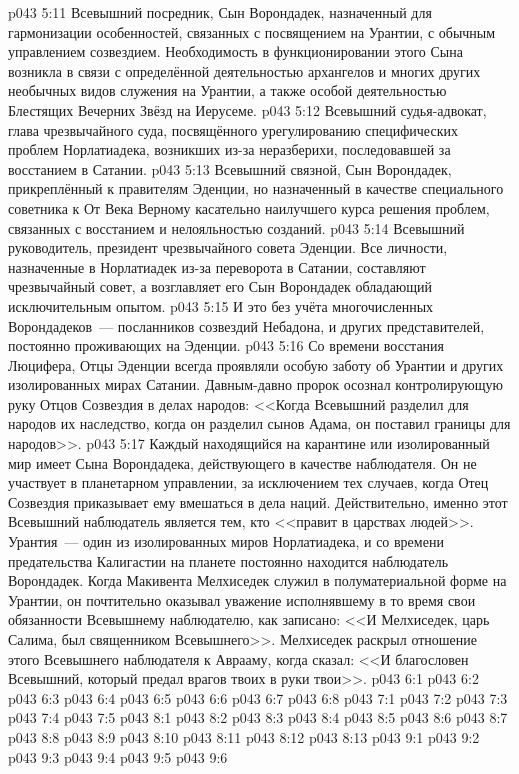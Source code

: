 \vs p043 5:11 Всевышний посредник, Сын Ворондадек, назначенный для гармонизации особенностей, связанных с посвящением на Урантии, с обычным управлением созвездием. Необходимость в функционировании этого Сына возникла в связи с определённой деятельностью архангелов и многих других необычных видов служения на Урантии, а также особой деятельностью Блестящих Вечерних Звёзд на Иерусеме.
\vs p043 5:12 Всевышний судья\hyp{}адвокат, глава чрезвычайного суда, посвящённого урегулированию специфических проблем Норлатиадека, возникших из-за неразберихи, последовавшей за восстанием в Сатании.
\vs p043 5:13 Всевышний связной, Сын Ворондадек, прикреплённый к правителям Эденции, но назначенный в качестве специального советника к От Века Верному касательно наилучшего курса решения проблем, связанных с восстанием и нелояльностью созданий.
\vs p043 5:14 Всевышний руководитель, президент чрезвычайного совета Эденции. Все личности, назначенные в Норлатиадек из-за переворота в Сатании, составляют чрезвычайный совет, а возглавляет его Сын Ворондадек обладающий исключительным опытом.
\vs p043 5:15 И это без учёта многочисленных Ворондадеков~--- посланников созвездий Небадона, и других представителей, постоянно проживающих на Эденции.
\vs p043 5:16 \pc Со времени восстания Люцифера, Отцы Эденции всегда проявляли особую заботу об Урантии и других изолированных мирах Сатании. Давным\hyp{}давно пророк осознал контролирующую руку Отцов Созвездия в делах народов: <<Когда Всевышний разделил для народов их наследство, когда он разделил сынов Адама, он поставил границы для народов>>.
\vs p043 5:17 Каждый находящийся на карантине или изолированный мир имеет Сына Ворондадека, действующего в качестве наблюдателя. Он не участвует в планетарном управлении, за исключением тех случаев, когда Отец Созвездия приказывает ему вмешаться в дела наций. Действительно, именно этот Всевышний наблюдатель является тем, кто <<правит в царствах людей>>. Урантия~--- один из изолированных миров Норлатиадека, и со времени предательства Калигастии на планете постоянно находится наблюдатель Ворондадек. Когда Макивента Мелхиседек служил в полуматериальной форме на Урантии, он почтительно оказывал уважение исполнявшему в то время свои обязанности Всевышнему наблюдателю, как записано: <<И Мелхиседек, царь Салима, был священником Всевышнего>>. Мелхиседек раскрыл отношение этого Всевышнего наблюдателя к Аврааму, когда сказал: <<И благословен Всевышний, который предал врагов твоих в руки твои>>.
\vs p043 6:1 
\vs p043 6:2 \pc 
\vs p043 6:3 
\vs p043 6:4 \pc 
\vs p043 6:5 
\vs p043 6:6 
\vs p043 6:7 
\vs p043 6:8 
\vs p043 7:1 
\vs p043 7:2 
\vs p043 7:3 
\vs p043 7:4 
\vs p043 7:5 
\vs p043 8:1 
\vs p043 8:2 
\vs p043 8:3 
\vs p043 8:4 
\vs p043 8:5 
\vs p043 8:6 
\vs p043 8:7 
\vs p043 8:8 
\vs p043 8:9 
\vs p043 8:10 
\vs p043 8:11 
\vs p043 8:12 \pc 
\vs p043 8:13 
\vs p043 9:1 
\vs p043 9:2 \pc 
\vs p043 9:3 
\vs p043 9:4 \pc 
\vs p043 9:5 
\vsetoff
\vs p043 9:6 
\quizlink
